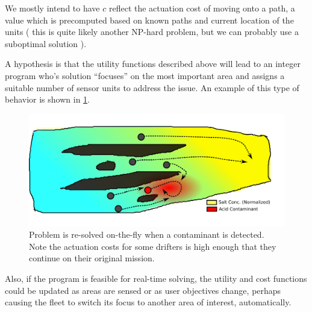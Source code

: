 \documentclass[letter,10pt]{article}
\begin{document}
We mostly intend to have $c$ reflect the actuation cost of moving onto a path, a value which is precomputed based on known paths and current location of the units ( this is quite likely another NP-hard problem, but we can probably use a suboptimal solution ).

A hypothesis is that the utility functions described above will lead to an integer program who's solution ``focuses'' on the most important area and assigns a suitable number of sensor units to address the issue.  An example of this type of behavior is shown in \ref{fig:focus}.

\begin{figure}[h]
 \centering
 \includegraphics[width=\linewidth ]{figures/combin_river_2.png}
 \caption{Problem is re-solved on-the-fly when a contaminant is detected. Note the actuation costs for some drifters is high enough that they continue on their original mission. \label{fig:focus}}
\end{figure}

Also, if the program is feasible for real-time solving, the utility and cost functions could be updated as areas are sensed or as user objectives change, perhaps causing the fleet to switch its focus to another area of interest, automatically. 
\end{document}
